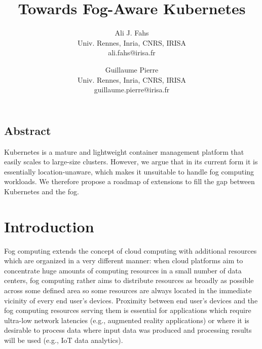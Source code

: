 \documentclass[letterpaper,twocolumn,10pt]{article}
\begin{document}
\date{}
\title{Towards Fog-Aware Kubernetes}
\author{
{\rm Ali J. Fahs}\\
Univ. Rennes, Inria, CNRS, IRISA\\
ali.fahs@irisa.fr
\and
{\rm Guillaume Pierre}\\
Univ. Rennes, Inria, CNRS, IRISA\\
guillaume.pierre@irisa.fr
}
\maketitle
\thispagestyle{empty}


\subsection*{Abstract}

Kubernetes is a mature and lightweight container management platform
that easily scales to large-size clusters. However, we argue that in
its current form it is essentially location-unaware, which makes it
unsuitable to handle fog computing workloads. We therefore propose a
roadmap of extensions to fill the gap between Kubernetes and the fog.

\section{Introduction}

Fog computing extends the concept of cloud computing with additional
resources which are organized in a very different manner: when cloud
platforms aim to concentrate huge amounts of computing resources in a
small number of data centers, fog computing rather aims to distribute
resources as broadly as possible across some defined area so some
resources are always located in the immediate vicinity of every end
user's devices. Proximity between end user's devices and the fog
computing resources serving them is essential for applications which
require ultra-low network latencies (e.g., augmented reality
applications) or where it is desirable to process data where input
data was produced and processing results will be used (e.g., IoT data
analytics).


\end{document}
